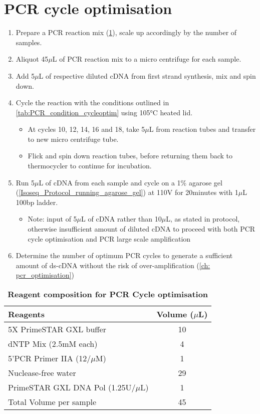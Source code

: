 \clearpage
\section{PCR cycle optimisation} 
\label{proto: pcr_cycle}
\begin{enumerate}
	\item Prepare a PCR reaction mix (\cref{tab:pcr_synthesis}), scale up accordingly by the number of samples.
	\item Aliquot 45$\mu$L of PCR reaction mix to a micro centrifuge for each sample. 
	\item Add 5$\mu$L of respective diluted cDNA from first strand synthesis, mix and spin down. 
	\item Cycle the reaction with the conditions outlined in \cref{tab:PCR_condition_cycleoptim} using 105°C heated lid.
	\begin{itemize}
		\item At cycles 10, 12, 14, 16 and 18, take 5$\mu$L from reaction tubes and transfer to new micro centrifuge tube.
		\item Flick and spin down reaction tubes, before returning them back to thermocycler to continue for incubation.  
	\end{itemize}
	\item Run 5$\mu$L of cDNA from each sample and cycle on a 1\% agarose gel (\cref{Isoseq_Protocol_running_agarose_gel}) at 110V for 20minutes with 1$\mu$L 100bp ladder.
	\begin{itemize}
		\item Note: input of 5$\mu$L of cDNA rather than 10$\mu$L, as stated in protocol, otherwise insufficient amount of diluted cDNA to proceed with both PCR cycle optimisation and PCR large scale amplification
	\end{itemize} 
	\item Determine the number of optimum PCR cycles to generate a sufficient amount of ds-cDNA without the risk of over-amplification (\cref{ch: pcr_optimisation})
\end{enumerate} 

\vspace{1cm}
\begin{table}[h]
	\centering
	\caption[Reagent composition for PCR Cycle optimisation]%
	{\textbf{Reagent composition for PCR Cycle optimisation}}
	\label{tab:pcr_synthesis}
	\begin{tabularx}{0.8\textwidth}{lc}
		\toprule 
		Reagents                         & Volume ($\mu$L) \\ \midrule
		5X PrimeSTAR GXL buffer          & 10          \\ 
		dNTP Mix (2.5mM each)            & 4           \\ 
		5'PCR Primer IIA (12/$\mu$M)     & 1           \\ 
		Nuclease-free water              & 29          \\ 
		PrimeSTAR GXL DNA Pol (1.25U/$\mu$L) & 1       \\ 
		Total Volume per sample          & 45          \\ 
		\bottomrule	
	\end{tabularx}
\end{table}

